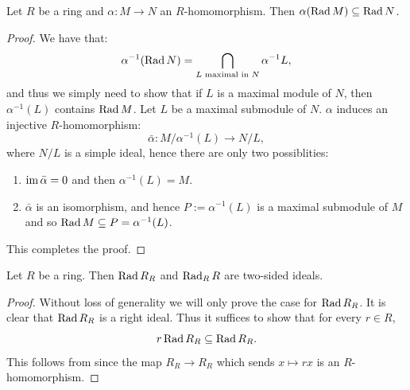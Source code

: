 \documentclass[11pt,a4paper]{article}
\begin{document}
\begin{lemma}
  \label{lem:radicals}
  Let $R$ be a ring and $\alpha \colon M \to N$ an $R$-homomorphism.
  Then $\alpha(\operatorname{Rad} M) \subseteq \operatorname{Rad} N$.
\end{lemma}
\begin{proof}
  We have that:
  \[
    \alpha^{-1}(\operatorname{Rad} N) =
    \bigcap_{L \text{ maximal in } N} \alpha^{-1} L,
  \]
  and thus we simply need to show that if $L$ is a maximal module of $N$,
  then $\alpha^{-1}(L)$ contains $\operatorname{Rad} M$.
  Let $L$ be a maximal submodule of $N$.
  $\alpha$ induces an injective $R$-homomorphism:
  \[
    \bar \alpha \colon M/\alpha^{-1}(L) \to N/L,
  \]
  where $N/L$ is a simple ideal,
  hence there are only two possiblities:
  \begin{enumerate}
    \item[(1)] $\operatorname{im} \bar \alpha = 0$ and then $\alpha^{-1}(L) = M$.
    \item[(2)] $\bar \alpha$ is an isomorphism, and hence
      $P := \alpha^{-1}(L)$ is a maximal submodule of $M$
      and so $\operatorname{Rad} M \subseteq P = \alpha^{-1}(L)$.
  \end{enumerate}
  This completes the proof.
\end{proof}

\begin{corollary}
  Let $R$ be a ring.
  Then $\operatorname{Rad} R_R$ and $\operatorname{Rad} _R R$ are two-sided ideals.
\end{corollary}
\begin{proof}
  Without loss of generality we will only prove the case for $\operatorname{Rad} R_R$.
  It is clear that $\operatorname{Rad} R_R$ is a right ideal.
  Thus it suffices to show that for every $r \in R$,
  \[
    r \operatorname{Rad} R_R \subseteq \operatorname{Rad} R_R.
  \]
  This follows from 
  since the map $R_R \to R_R$ which sends $x \mapsto r x$
  is an $R$-homomorphism.
\end{proof}
\end{document}
